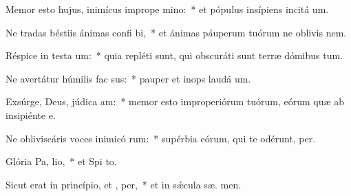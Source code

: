 \item Memor esto hujus, inimícus imprope mino:~* et pópulus insípiens incitá  um.
\item Ne tradas béstiis ánimas confi bi,~* et ánimas páuperum tuórum ne oblivis  nem.
\item Réspice in testa um:~* quia repléti sunt, qui obscuráti sunt terræ dómibus tum.
\item Ne avertátur húmilis fac sus:~* pauper et inops laudá  um.
\item Exsúrge, Deus, júdica  am:~* memor esto improperiórum tuórum, eórum quæ ab insipiénte   e.
\item Ne obliviscáris voces inimicó rum:~* supérbia eórum, qui te odérunt,  per.
\item Glória Pa,  lio,~* et Spi to.
\item Sicut erat in princípio, et ,  per,~* et in sǽcula sæ. men.
